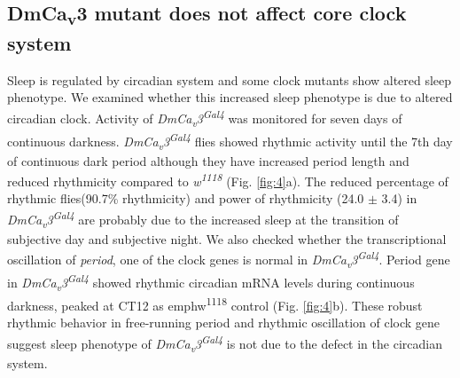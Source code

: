 \subsection*{DmCa\textsubscript{v}3 mutant does not affect core clock system}

Sleep is regulated by circadian system and some clock mutants show altered sleep phenotype\cite{12568241, 19038223}.
We examined whether this increased sleep phenotype is due to altered circadian clock.
Activity of \emph{DmCa\textsubscript{v}3\textsuperscript{Gal4}} was monitored for seven days of continuous darkness.
\emph{DmCa\textsubscript{v}3\textsuperscript{Gal4}} flies showed rhythmic activity until the 7th day of continuous dark period although they have increased period length and reduced rhythmicity compared to \emph{w\textsuperscript{1118}} (Fig. \ref{fig:4}a). The reduced percentage of rhythmic flies(90.7\% rhythmicity) and power of rhythmicity (24.0 $\pm$ 3.4) in \emph{DmCa\textsubscript{v}3\textsuperscript{Gal4}} are probably due to the increased sleep at the transition of subjective day and subjective night.
We also checked whether the transcriptional oscillation of \emph{period}, one of the clock genes is normal in \emph{DmCa\textsubscript{v}3\textsuperscript{Gal4}}. 
Period gene in \emph{DmCa\textsubscript{v}3\textsuperscript{Gal4}} showed rhythmic circadian mRNA levels during continuous darkness, peaked at CT12 as emph{w\textsuperscript{1118}} control (Fig. \ref{fig:4}b).
These robust rhythmic behavior in free-running period and rhythmic oscillation of clock gene suggest sleep phenotype of \emph{DmCa\textsubscript{v}3\textsuperscript{Gal4}} is not due to the defect in the circadian system. 
    
  
  
  
  